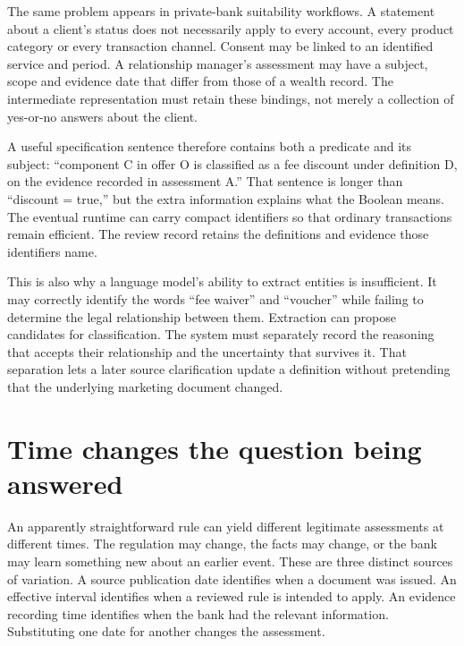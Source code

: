 \documentclass[12pt,a4paper,oneside,openany]{book}
\begin{document}
The same problem appears in private-bank suitability workflows. A statement
about a client's status does not necessarily apply to every account, every
product category or every transaction channel. Consent may be linked to an
identified service and period. A relationship manager's assessment may have a
subject, scope and evidence date that differ from those of a wealth record.
The intermediate representation must retain these bindings, not merely a
collection of yes-or-no answers about the client.

A useful specification sentence therefore contains both a predicate and its
subject: ``component C in offer O is classified as a fee discount under
definition D, on the evidence recorded in assessment A.'' That sentence is longer
than ``discount = true,'' but the extra information explains what the Boolean
means. The eventual runtime can carry compact identifiers so that ordinary
transactions remain efficient. The review record retains the definitions and
evidence those identifiers name.

This is also why a language model's ability to extract entities is insufficient.
It may correctly identify the words ``fee waiver'' and ``voucher'' while failing
to determine the legal relationship between them. Extraction can propose
candidates for classification. The system must separately record the reasoning
that accepts their relationship and the uncertainty that survives it. That
separation lets a later source clarification update a definition without
pretending that the underlying marketing document changed.

\section{Time changes the question being answered}
\label{merge:M01:06}

\label{sec:problem-time}
An apparently straightforward rule can yield different legitimate assessments
at different times. The regulation may change, the facts may change, or the
bank may learn something new about an earlier event. These are three distinct
sources of variation. A source publication date identifies when a document was
issued. An effective interval identifies when a reviewed rule is intended to
apply. An evidence recording time identifies when the bank had the relevant
information. Substituting one date for another changes the assessment.
\end{document}
